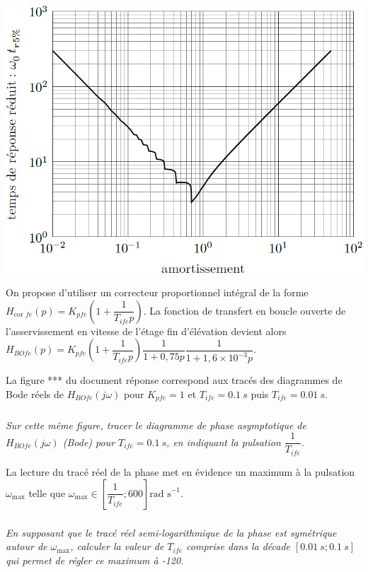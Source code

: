 \documentclass[10pt,fleqn]{article} %
\begin{document}
\begin{multicols}{2}
\begin{center}
\includegraphics[width=\linewidth]{images/fig_03}
\end{center}


On propose d’utiliser un correcteur proportionnel intégral de la forme $H_{\text{cor }fe}(p)=K_{pfe}\left(1+\dfrac{1}{T_{ife}p}\right)$. La fonction de transfert en boucle ouverte de l’asservissement en vitesse de l’étage fin d’élévation devient alors 
$
H_{BOfe}(p)=K_{pfe}\left( 1+\dfrac{1}{T_{ife}p}\right) \dfrac{1}{1+0,75p} \dfrac{1}{1+1,6\times 10^{-3}p}
$.

La figure *** du document réponse correspond aux tracés des diagrammes de Bode réels de $H_{BOfe}(j\omega)$ 
pour $K_{pfe}=1$ et $T_{ife}=\SI{0,1}{s}$ puis $T_{ife}=\SI{0,01}{s}$.


\subparagraph{}\textit{Sur cette même figure, tracer le diagramme de phase asymptotique de $H_{BOfe}(j\omega)$
(Bode) pour $T_{ife}=\SI{0,1}{s}$, en indiquant la pulsation $\dfrac{1}{T_{ife}}$.}
\ifprof
\begin{corrige}
\end{corrige}
\else
\fi

La lecture du tracé réel de la phase met en évidence un maximum à la pulsation $\omega_{\text{max}}$ telle que $\omega_{\text{max}}\in \left[\dfrac{1}{T_{ife}};600 \right]\text{rad s}^{-1}$.

\subparagraph{}\textit{En supposant que le tracé réel semi-logarithmique de la phase est symétrique autour de $\omega_{\text{max}}$, calculer la valeur de $T_{ife}$ comprise dans la décade $\left[\SI{0,01}{s}; \SI{0,1}{s}\right]$ qui permet de régler ce maximum à -120\degres.}
\ifprof
\begin{corrige}
\end{corrige}
\else
\fi


\end{multicols}
\end{document}

